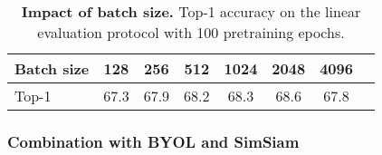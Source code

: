 \documentclass{article}
\begin{document}
\begin{table}[t]
\caption{\textbf{Impact of batch size.} Top-1 accuracy on the linear evaluation protocol with 100 pretraining epochs.}
\label{tab:ablation_bs}
\vspace{-6mm}
\setlength{\tabcolsep}{10.5pt}
\vskip 0.15in
\begin{center}
\begin{tabular}{lccccccc}
\toprule
Batch size      & 128      & 256      & 512      & 1024     & 2048     & 4096 \\
\midrule
Top-1           & 67.3 & 67.9 & 68.2 & 68.3 & 68.6 & 67.8 \\
\bottomrule
\end{tabular}
\end{center}
\vspace{-2mm}
\end{table}


\subsubsection{Combination with BYOL and SimSiam} \label{app:combination}
\end{document}
